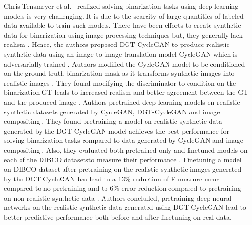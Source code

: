 Chris Tensmeyer et al.\ \cite{8978087} realized solving binarization tasks using deep learning models is very challenging. It is due to the scarcity of large quantities of labeled data available to train such models. There have been efforts to create synthetic data for binarization using image processing techniques but, they generally lack realism \cite{8978087}. Hence, the authors proposed DGT-CycleGAN to produce realistic synthetic data using an image-to-image translation model \ac{CycleGAN} which is adversarially trained \cite{8978087}. Authors modified the \ac{CycleGAN} model to be conditioned on the ground truth binarization mask as it transforms synthetic images into realistic images \cite{8978087}. They found modifying the discriminator to condition on the binarization \ac{GT} leads to increased realism and better agreement between the \ac{GT} and the produced image \cite{8978087}.  Authors pretrained deep learning models on realistic synthetic datasets generated by \ac{CycleGAN}, DGT-CycleGAN and image compositing \cite{8978087}. They found pretraining a model on realistic synthetic data generated by the DGT-CycleGAN model achieves the best performance for solving binarization tasks compared to data generated by \ac{CycleGAN} and image compositing \cite{8978087}. Also, they evaluated both pretrained only and finetuned models on each of the \ac{DIBCO} datasets\footnotemark to measure their performance \cite{8978087}. Finetuning a model on \ac{DIBCO} dataset after pretraining on the realistic synthetic images generated by the DGT-CycleGAN has lead to a 13\% reduction of F-measure error compared to no pretraining and to 6\% error reduction compared to pretraining on non-realistic synthetic data \cite{8978087}. Authors concluded, pretraining deep neural networks on the realistic synthetic data generated using DGT-CycleGAN lead to better predictive performance both before and after finetuning on real data.



